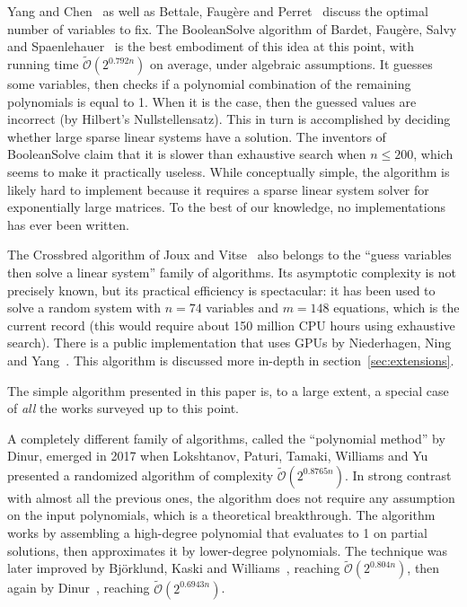 \documentclass[a4paper,UKenglish,cleveref, autoref]{lipics-v2019}
\newcommand{\bigOsoft}[1]{\ensuremath{\mathcal{\tilde O}\left( #1 \right)} }
\begin{document}
Yang and Chen~\cite{YangC04} as well as Bettale, Faugère and
Perret~\cite{BettaleFP09} discuss the optimal number of variables to fix. The
\textsf{BooleanSolve} algorithm of Bardet, Faugère, Salvy and
Spaenlehauer~\cite{BardetFSS13} is the best embodiment of this idea at this
point, with running time $\bigOsoft{2^{0.792n}}$ on average, under algebraic
assumptions. It guesses some variables, then checks if a polynomial combination
of the remaining polynomials is equal to 1. When it is the case, then the
guessed values are incorrect (by Hilbert's Nullstellensatz). This in turn is
accomplished by deciding whether large sparse linear systems have a
solution. The inventors of \textsf{BooleanSolve} claim that it is slower than
exhaustive search when $n \leq 200$, which seems to make it practically
useless. While conceptually simple, the algorithm is likely hard to implement
because it requires a sparse linear system solver for exponentially large
matrices. To the best of our knowledge, no implementations has ever been
written.

The \textsf{Crossbred} algorithm of Joux and Vitse~\cite{JouxV17} also belongs
to the ``guess variables then solve a linear system'' family of algorithms. Its
asymptotic complexity is not precisely known, but its practical efficiency is
spectacular: it has been used to solve a random system with $n = 74$ variables
and $m=148$ equations, which is the current record (this would require about 150
million CPU hours using exhaustive search). There is a public implementation
that uses GPUs by Niederhagen, Ning and Yang~\cite{NiederhagenNY18}. This
algorithm is discussed more in-depth in section~\ref{sec:extensions}.

The simple algorithm presented in this paper is, to a large extent, a special
case of \emph{all} the works surveyed up to this point.

A completely different family of algorithms, called the ``polynomial method'' by
Dinur, emerged in 2017 when Lokshtanov, Paturi, Tamaki, Williams and
Yu~\cite{LokshtanovPTWY17} presented a randomized algorithm of complexity
$\bigOsoft{2^{0.8765n}}$. In strong contrast with almost all the previous ones,
the algorithm does not require any assumption on the input polynomials, which is
a theoretical breakthrough. The algorithm works by assembling a high-degree
polynomial that evaluates to 1 on partial solutions, then approximates it by
lower-degree polynomials. The technique was later improved by Björklund, Kaski
and Williams~\cite{BjorklundK019}, reaching $\bigOsoft{2^{0.804n}}$, then again
by Dinur~\cite{Dinur21}, reaching $\bigOsoft{2^{0.6943n}}$.
\end{document}

